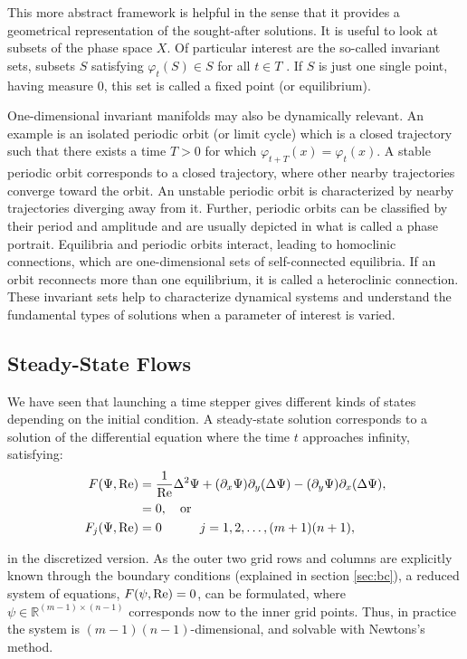 This more abstract framework is helpful in the sense that it provides a
geometrical representation of the sought-after solutions. It is useful to look
at subsets of the phase space $X$. Of particular interest are the so-called
invariant sets, subsets $S$ satisfying $\varphi_t(S) \in S$ for all $t \in T$
\citep{kuznetsov2004}. If $S$ is just one single point, having measure $0$,
this set is called a fixed point (or equilibrium). 

One-dimensional invariant manifolds may also be dynamically relevant. An
example is an isolated periodic orbit (or limit cycle) which is a closed
trajectory such that there exists a time $T > 0$ for which $\varphi_{t+T}(x) =
\varphi_{t}(x)$. A stable periodic orbit corresponds to a closed trajectory,
where other nearby trajectories converge toward the orbit. An unstable
periodic orbit is characterized by nearby trajectories diverging away from it.
Further, periodic orbits can be classified by their period and amplitude and
are usually depicted in what is called a phase portrait. Equilibria and
periodic orbits interact, leading to homoclinic connections, which are
one-dimensional sets of self-connected equilibria. If an orbit reconnects more
than one equilibrium, it is called a heteroclinic connection. These invariant
sets help to characterize dynamical systems and understand the fundamental
types of solutions when a parameter of interest is varied.

\subsection{Steady-State Flows}

We have seen that launching a time stepper gives different kinds of states
depending on the initial condition. A steady-state solution corresponds to a
solution of the differential equation where the time $t$ approaches infinity,
satisfying:
\begin{align}
  F(\Psi, \mathrm{Re}) &= \frac{1}{\mathrm{Re}}\Delta^2 \Psi +
    (\partial_x \Psi) \partial_y(\Delta \Psi) -
    (\partial_y \Psi) \partial_x(\Delta \Psi), \nonumber \\
  & =  0, \quad \text{or} \\
  F_j(\Psi, \mathrm{Re}) &= 0 \quad \quad \quad 
  j= 1,2,\dots,(m+1)(n+1), \label{eq:str_steady}
\end{align}

in the discretized version. As the outer two grid rows and columns are
explicitly known through the boundary conditions (explained in section
\ref{sec:bc}), a reduced system of equations, $F(\psi, \mathrm{Re}) = 0$, can be
formulated, where $\psi \in \mathbb{R}^{(m-1)\times(n-1)} $ corresponds now to
the inner grid points. Thus, in practice the system is
$(m-1)(n-1)$-dimensional, and solvable with Newtons's method.

